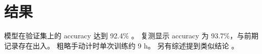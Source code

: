 \documentclass{article}
\begin{document}
\section{结果}
模型在验证集上的 accuracy 达到 92.4\% \cite{wang2021cnn}。
复测显示 accuracy 为 93.7\%，与前期记录存在出入。
粗略手动计时单次训练约 9 h。
另有综述提到类似结论 \cite{zhang2023unknown}。
\end{document}
